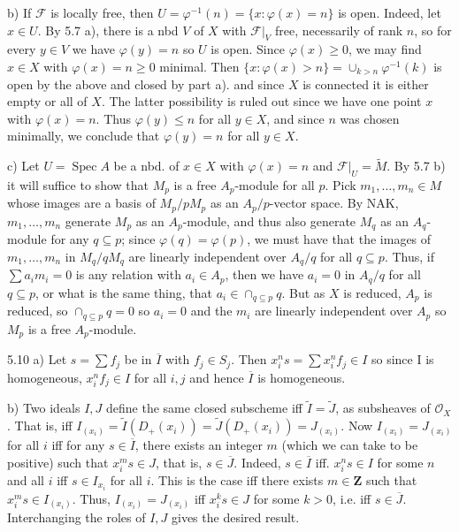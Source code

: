 \documentclass{report}
\newcommand{\F}{\mathcal{F}}
\renewcommand{\O}{\mathcal{O}}
\newcommand{\Z}{\mathbf{Z}}
\DeclareMathOperator{\Spec}{Spec}
\begin{document}
\noindent
b)	If $\F$ is locally free, then $U=\varphi^{-1}(n)=\{x:\varphi(x)=n\}$ is open.  Indeed, 
let $x\in U$.  By 5.7 a), there is a nbd $V$ of $X$ with $\F\big|_{V}$ free, necessarily
of rank $n$, so for every $y\in V$ we have $\varphi(y)=n$ so $U$ is open.	
Since $\varphi(x)\ge 0$, we may find $x\in X$ with $\varphi(x)=n\ge 0$ minimal.
Then $\{x:\varphi(x)> n\}=\cup_{k> n} \varphi^{-1}(k)$ is open by the above and  closed by part a).
and since $X$ is connected it is either empty or all of $X$.  The latter possibility is
ruled out since we have one point $x$ with $\varphi(x)=n$.  Thus $\varphi(y)\le n$ for all $y\in X$,
and since $n$ was chosen minimally, we conclude that $\varphi(y)=n$ for all $y\in X$.  

\noindent
c)	Let $U=\Spec A$ be a nbd. of $x\in X$ with $\varphi(x)=n$ and $\F\big|_U=\widetilde{M}$.
By 5.7 b) it will suffice to show that $M_p$ is a free $A_p$-module
for all $p$.	Pick $m_1,\ldots,m_n\in M$ whose images are a basis of $M_p/pM_p$ as an $A_p/p$-vector space.
By NAK, $m_1,\ldots,m_n$ generate $M_p$ as an $A_p$-module, and thus also generate $M_q$ 
as an $A_q$-module for any $q\subseteq p$; since $\varphi(q)=\varphi(p)$, we must have that the images of
$m_1,\ldots,m_n$ in $M_q/qM_q$ are linearly independent over $A_q/q$ for all $q\subseteq p$.
Thus, if $\sum a_i m_i=0$ is any relation with $a_i\in A_p$, then we have $a_i=0$ in $A_q/q$ for all $q\subseteq p$,
or what is the same thing, that $a_i\in \cap_{q\subseteq p} q$.	But as $X$ is reduced,
$A_p$ is reduced, so $\cap_{q\subseteq p} q=0$ so $a_i=0$ and the $m_i$ are linearly independent
over $A_p$ so $M_p$ is a free $A_p$-module.


\bigskip
\noindent

5.10	a)	Let $s=\sum f_j$ be in $\overline{I}$ with $f_j\in S_j$.	Then $x_i^ns=\sum x_i^n f_j\in I$
so since I is homogeneous, $x_i^n f_j\in I$ for all $i,j$ and hence $\overline{I}$ is homogeneous.

\noindent
b)	Two ideals $I,J$ define the same closed subscheme iff $\widetilde{I}= \widetilde{J}$, as 
subsheaves of $\O_X$.	That is, iff $I_{(x_i)}=\widetilde{I}(D_+(x_i))=\widetilde{J}(D_+(x_i))=J_{(x_i)}$.
Now $I_{(x_i)}=J_{(x_i)}$ for all $i$ iff for any $s\in \overline{I}$, there exists an integer $m$ (which we can take to be positive)
such that $x_i^m s\in J$, that is, $s\in\overline{J}$.  
Indeed, $s\in \overline{I}$ iff.  $x_i^n s\in I$ for some $n$ and all $i$ iff $s\in I_{x_i}$ for all $i$.
This is the case iff there exists $m\in \Z$ such that $x_i^m s\in I_{(x_i)}$.
Thus, $I_{(x_i)}=J_{(x_i)}$ iff $x_i^k s\in J $ for some $k>0$, i.e. iff $s\in \overline{J}$.
Interchanging the roles of $I,J$ gives the desired result. 
\end{document}
